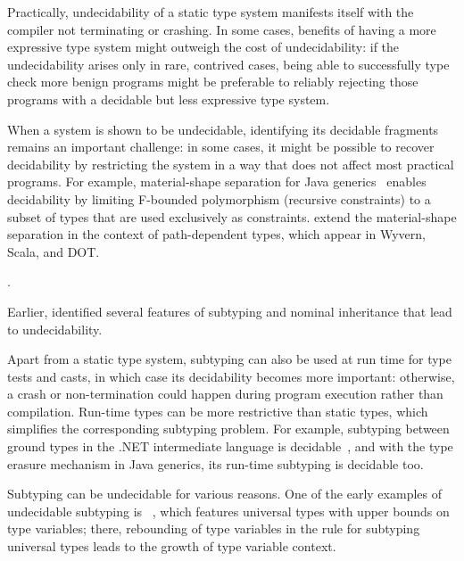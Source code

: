 Practically, undecidability of a static type system manifests itself with
the compiler not terminating or crashing. In some cases,
benefits of having a more expressive type system might outweigh the cost of
undecidability: if the undecidability arises only in rare, contrived cases,
being able to successfully type check more benign programs
might be preferable to reliably rejecting those
programs with a decidable but less expressive type system.

When a system is shown to be undecidable, identifying its decidable fragments
remains an important challenge: in some cases, it might be possible to recover
decidability by restricting the system in a way that does not affect most
practical programs. For example, material-shape separation for Java
generics~\cite{greenman:f-bound-material-shape:2014} enables decidability
by limiting F-bounded polymorphism (recursive constraints) to a subset of types
that are used exclusively as constraints.
\citet{mackay:path-dep-dec:2020} extend 
the material-shape separation in the context of path-dependent types, which
appear in Wyvern, Scala, and DOT.



\cite{hu:dot-undec:2020,mackay:bound-poly-sub-dec:2020,kennedy:nom-sub-var-dec:2007}.

Earlier, \citet{kennedy:nom-sub-var-dec:2007} identified several features of subtyping
and nominal inheritance that lead to undecidability.


Apart from a static type system,
subtyping can also be used at run time for type tests and casts,
in which case its decidability becomes more important: otherwise, a crash or
non-termination could happen during program execution rather than compilation.
Run-time types can be more restrictive than static types, which
simplifies the corresponding subtyping problem.
For example, subtyping between ground types in the .NET intermediate
language is decidable~\cite{kennedy:nom-sub-var-dec:2007},
and with the type erasure mechanism in Java generics,
its run-time subtyping is decidable too.

Subtyping can be undecidable for various reasons.
One of the early examples of undecidable subtyping is
\FSub~\cite{cardelli:fsub:1991,pierce:bound-sub-undec:1992},
which features universal types with upper bounds on type variables;
there, rebounding of type variables in the rule for subtyping universal types
leads to the growth of type variable context.


